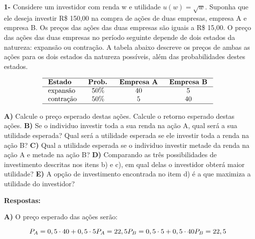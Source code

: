 \singlespacing

\textbf{1-} Considere um investidor com renda w e utilidade $u(w) = \sqrt{w}$. Suponha que ele deseja
investir R\$ 150,00 na compra de ações de duas empresas, empresa A e empresa B. Os preços das ações das duas empresas são iguais a R\$ 15,00. O preço das ações das duas empresas no período seguinte depende de dois estados da natureza: expansão ou contração. A tabela
abaixo descreve os preços de ambas as ações para os dois estados da natureza possíveis, além das probabilidades destes estados.

\begin{equation}
\begin{array}{lccc}
\hline \text { \textbf{Estado} } & \text { \textbf{Prob.} } & \text { \textbf{Empresa A} } & \text { \textbf{Empresa B} } \\
\hline \text { expansão } & 50 \% & 40 & 5 \\
\text { contração } & 50 \% & 5 & 40 \\
\hline
\end{array}
\end{equation}

\singlespacing

\textbf{A)} Calcule o preço esperado destas ações. Calcule o retorno esperado destas ações.
\singlespacing
\textbf{B)} Se o individuo investir toda a sua renda na ação A, qual será a sua utilidade esperada?
Qual será a utilidade esperada se ele investir toda a renda na ação B?
\singlespacing
\textbf{C)} Qual a utilidade esperada se o individuo investir metade da renda na ação A e metade na ação B?
\singlespacing
\textbf{D)} Comparando as três possibilidades de investimento descritas nos itens b) e c), em qual delas o investidor obterá maior utilidade?
\singlespacing
\textbf{E)} A opção de investimento encontrada no item d) é a que maximiza a utilidade do investidor?

\singlespacing

\textbf{Respostas:}

\singlespacing

\textbf{A)} O preço esperado das ações serão:

\begin{equation}
	P_{A} = 0,5 \cdot 40 + 0,5 \cdot 5
	$$\\$$
	P_{A} = 22,5
	$$\\$$
	P_{B} = 0,5 \cdot 5 + 0,5 \cdot 40
	$$\\$$ P_{B} = 22,5
\end{equation}

